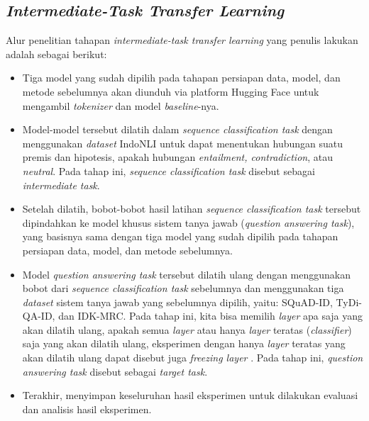 \subsection{\emph{Intermediate-Task Transfer Learning}}
Alur penelitian tahapan \emph{intermediate-task transfer learning} yang penulis lakukan adalah sebagai berikut:

\begin{itemize}
    
    \item Tiga model yang sudah dipilih pada tahapan persiapan data, model, dan metode sebelumnya akan diunduh via platform Hugging Face untuk mengambil \emph{tokenizer} dan model \emph{baseline}-nya.

    \item Model-model tersebut dilatih dalam \emph{sequence classification task} dengan menggunakan \emph{dataset} IndoNLI untuk dapat menentukan hubungan suatu premis dan hipotesis, apakah hubungan \emph{entailment, contradiction}, atau \emph{neutral}. Pada tahap ini, \emph{sequence classification task} disebut sebagai \emph{intermediate task}.

    \item Setelah dilatih, bobot-bobot hasil latihan \emph{sequence classification task} tersebut dipindahkan ke model khusus sistem tanya jawab (\emph{question answering task}), yang basisnya sama dengan tiga model yang sudah dipilih pada tahapan persiapan data, model, dan metode sebelumnya.

    \item Model \emph{question answering task} tersebut dilatih ulang dengan menggunakan bobot dari \emph{sequence classification task} sebelumnya dan menggunakan tiga \emph{dataset} sistem tanya jawab yang sebelumnya dipilih, yaitu: SQuAD-ID, TyDi-QA-ID, dan IDK-MRC. Pada tahap ini, kita bisa memilih \emph{layer} apa saja yang akan dilatih ulang, apakah semua \emph{layer} atau hanya \emph{layer} teratas (\emph{classifier}) saja yang akan dilatih ulang, eksperimen dengan hanya \emph{layer} teratas yang akan dilatih ulang dapat disebut juga \emph{freezing layer} \citep{lee2019elsa}. Pada tahap ini, \emph{question answering task} disebut sebagai \emph{target task}.

    \item Terakhir, menyimpan keseluruhan hasil eksperimen untuk dilakukan evaluasi dan analisis hasil eksperimen.

\end{itemize}

